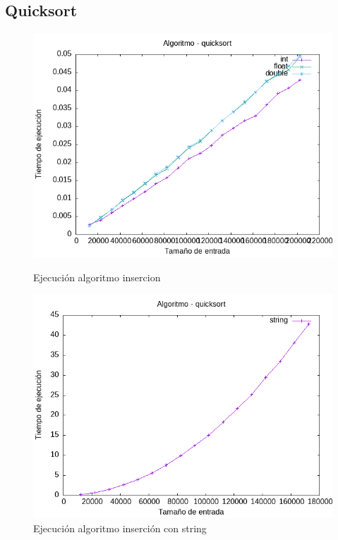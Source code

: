 \documentclass[11pt]{article}
\begin{document}
\subsection*{Quicksort}
\begin{figure}[H]
    \begin{minipage}{0.5\textwidth}
        \centering
        \includegraphics[width=\linewidth]{assets/Img/quicksort.png}
        \caption{Ejecución algoritmo insercion}
        \label{fig:insercion}
    \end{minipage}%
    \begin{minipage}{0.5\textwidth}
        \centering
        \includegraphics[width=\linewidth]{assets/Img/quicksortstring.png}
        \caption{Ejecución algoritmo inserción con string}
        \label{fig:insercionstring}
    \end{minipage}
\end{figure}
\end{document}
